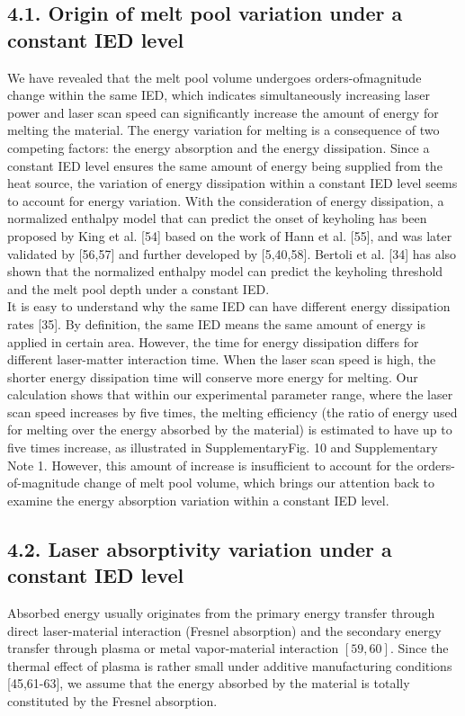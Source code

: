 \documentclass[10pt]{article}
\begin{document}
\subsection*{4.1. Origin of melt pool variation under a constant IED level}
We have revealed that the melt pool volume undergoes orders-ofmagnitude change within the same IED, which indicates simultaneously increasing laser power and laser scan speed can significantly increase the amount of energy for melting the material. The energy variation for melting is a consequence of two competing factors: the energy absorption and the energy dissipation. Since a constant IED level ensures the same amount of energy being supplied from the heat source, the variation of energy dissipation within a constant IED level seems to account for energy variation. With the consideration of energy dissipation, a normalized enthalpy model that can predict the onset of keyholing has been proposed by King et al. [54] based on the work of Hann et al. [55], and was later validated by [56,57] and further developed by [5,40,58]. Bertoli et al. [34] has also shown that the normalized enthalpy model can predict the keyholing threshold and the melt pool depth under a constant IED.\\
It is easy to understand why the same IED can have different energy dissipation rates [35]. By definition, the same IED means the same amount of energy is applied in certain area. However, the time for energy dissipation differs for different laser-matter interaction time. When the laser scan speed is high, the shorter energy dissipation time will conserve more energy for melting. Our calculation shows that within our experimental parameter range, where the laser scan speed increases by five times, the melting efficiency (the ratio of energy used for melting over the energy absorbed by the material) is estimated to have up to five times increase, as illustrated in SupplementaryFig. 10 and Supplementary Note 1. However, this amount of increase is insufficient to account for the orders-of-magnitude change of melt pool volume, which brings our attention back to examine the energy absorption variation within a constant IED level.

\subsection*{4.2. Laser absorptivity variation under a constant IED level}
Absorbed energy usually originates from the primary energy transfer through direct laser-material interaction (Fresnel absorption) and the secondary energy transfer through plasma or metal vapor-material interaction $[59,60]$. Since the thermal effect of plasma is rather small under additive manufacturing conditions [45,61-63], we assume that the energy absorbed by the material is totally constituted by the Fresnel absorption.
\end{document}
